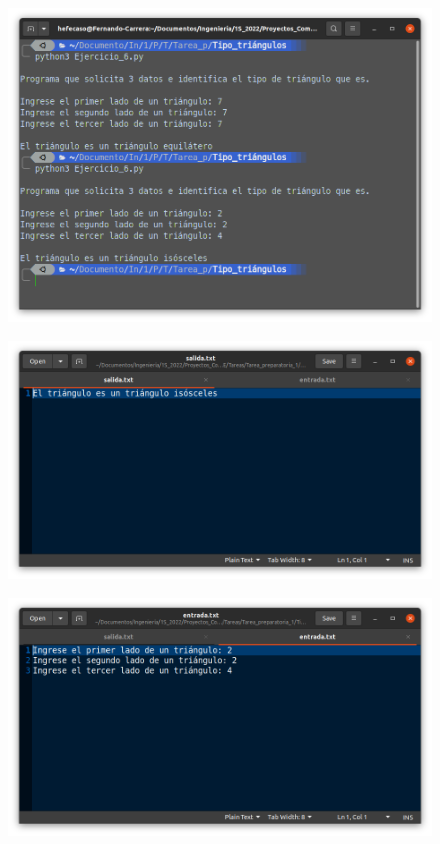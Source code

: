 \documentclass[12pt,letterpaper]{article}
\begin{document}
\begin{multicols}{2}
\begin{figure}[H]
\centering
\includegraphics[width = \columnwidth]{4-py_triangulo.png}
\end{figure}


\begin{figure}[H]
\centering
\includegraphics[width = \columnwidth]{4-txt_1_triangulo.png.png}
\end{figure}


\begin{figure}[H]
\centering
\includegraphics[width = \columnwidth]{4-txt_2_triangulo.png.png}
\end{figure}



\end{multicols}
\end{document}
